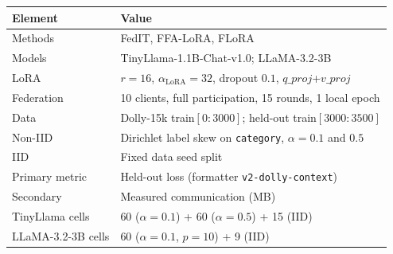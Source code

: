 \begin{tabular}{ll}
\toprule
Element & Value \\
\midrule
Methods & FedIT, FFA-LoRA, FLoRA \\
Models & TinyLlama-1.1B-Chat-v1.0; LLaMA-3.2-3B \\
LoRA & $r{=}16$, $\alpha_{\mathrm{LoRA}}{=}32$, dropout $0.1$, $q\_proj$+$v\_proj$ \\
Federation & 10 clients, full participation, 15 rounds, 1 local epoch \\
Data & Dolly-15k train$[0{:}3000]$; held-out train$[3000{:}3500]$ \\
Non-IID & Dirichlet label skew on \texttt{category}, $\alpha{=}0.1$ and $0.5$ \\
IID & Fixed data seed split \\
Primary metric & Held-out loss (formatter \texttt{v2-dolly-context}) \\
Secondary & Measured communication (MB) \\
TinyLlama cells & 60 ($\alpha{=}0.1$) + 60 ($\alpha{=}0.5$) + 15 (IID) \\
LLaMA-3.2-3B cells & 60 ($\alpha{=}0.1$, $p{=}10$) + 9 (IID) \\
\bottomrule
\end{tabular}
